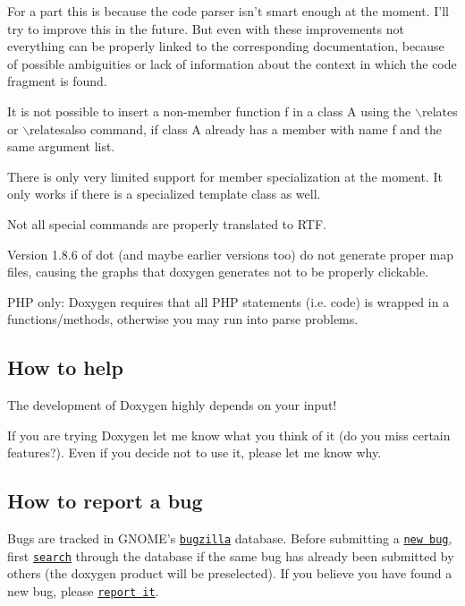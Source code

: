 \begin{DoxyItemize}
For a part this is because the code parser isn't smart enough at the moment. I'll try to improve this in the future. But even with these improvements not everything can be properly linked to the corresponding documentation, because of possible ambiguities or lack of information about the context in which the code fragment is found. 
\item It is not possible to insert a non-\/member function f in a class A using the $\backslash$relates or $\backslash$relatesalso command, if class A already has a member with name f and the same argument list. 
\item There is only very limited support for member specialization at the moment. It only works if there is a specialized template class as well. 
\item Not all special commands are properly translated to RTF. 
\item Version 1.8.6 of dot (and maybe earlier versions too) do not generate proper map files, causing the graphs that doxygen generates not to be properly clickable. 
\item PHP only: Doxygen requires that all PHP statements (i.e. code) is wrapped in a functions/methods, otherwise you may run into parse problems. 
\end{DoxyItemize}

\subsection*{How to help}

The development of Doxygen highly depends on your input!

If you are trying Doxygen let me know what you think of it (do you miss certain features?). Even if you decide not to use it, please let me know why.

\label{trouble_bug_reports}
\hypertarget{trouble_bug_reports}{}
 \subsection*{How to report a bug}

Bugs are tracked in GNOME's \href{http://bugzilla.gnome.org}{\tt bugzilla} database. Before submitting a \href{http://bugzilla.gnome.org/enter_bug.cgi?product=doxygen}{\tt new bug}, first \href{http://bugzilla.gnome.org/query.cgi?format=advanced&product=doxygen}{\tt search} through the database if the same bug has already been submitted by others (the doxygen product will be preselected). If you believe you have found a new bug, please \href{http://bugzilla.gnome.org/enter_bug.cgi?product=doxygen}{\tt report it}.

